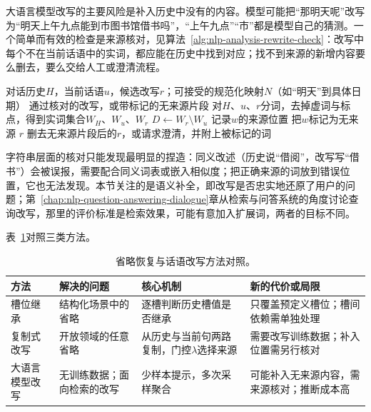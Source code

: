 大语言模型改写的主要风险是补入历史中没有的内容。模型可能把“那明天呢”改写为“明天上午九点能到市图书馆借书吗”，“上午九点”“市”都是模型自己的猜测。一个简单而有效的检查是来源核对，见算法~\ref{alg:nlp-analysis-rewrite-check}：改写中每个不在当前话语中的实词，都应能在历史中找到对应；找不到来源的新增内容要么删去，要么交给人工或澄清流程。

\begin{algorithm}[改写结果的来源核对]
  \label{alg:nlp-analysis-rewrite-check}
  \begin{algorithmic}[1]
    \Require 对话历史$H$，当前话语$u$，候选改写$r$；可接受的规范化映射$N$（如“明天”到具体日期）
    \Ensure 通过核对的改写，或带标记的无来源片段
    \State 对$H$、$u$、$r$分词，去掉虚词与标点，得到实词集合$W_H$、$W_u$、$W_r$
    \State $D\gets W_r\setminus W_u$
        \State 记录$w$的来源位置
      \Else
        \State 把$w$标记为无来源
      \EndIf
    \EndFor
      \State \Return $r$
    \Else
      \State \Return 删去无来源片段后的$r$，或请求澄清，并附上被标记的词
    \EndIf
  \end{algorithmic}
\end{algorithm}

字符串层面的核对只能发现最明显的捏造：同义改述（历史说“借阅”，改写写“借书”）会被误报，需要配合同义词表或嵌入相似度；把正确来源的词放到错误位置，它也无法发现。本节关注的是语义补全，即改写是否忠实地还原了用户的问题；第~\ref{chap:nlp-question-answering-dialogue}章从检索与问答系统的角度讨论查询改写，那里的评价标准是检索效果，可能有意加入扩展词，两者的目标不同。

表~\ref{tab:nlp-analysis-rewriting-methods}对照三类方法。

\begin{table}[htbp]
  \centering
  \small
  \begin{tabularx}{\linewidth}{@{}l XXX@{}}
    \toprule
    方法 & 解决的问题 & 核心机制 & 新的代价或局限\\
    \midrule
    槽位继承 & 结构化场景中的省略 & 逐槽判断历史槽值是否继承 & 只覆盖预定义槽位；槽间依赖需单独处理\\
    复制式改写 & 开放领域的任意省略 & 从历史与当前句两路复制，门控$\lambda$选择来源 & 需要改写训练数据；补入位置需另行核对\\
    大语言模型改写 & 无训练数据；面向检索的改写 & 少样本提示，多次采样聚合 & 可能补入无来源内容，需来源核对；推断成本高\\
    \bottomrule
  \end{tabularx}
  \caption{省略恢复与话语改写方法对照。}
  \label{tab:nlp-analysis-rewriting-methods}
\end{table}

